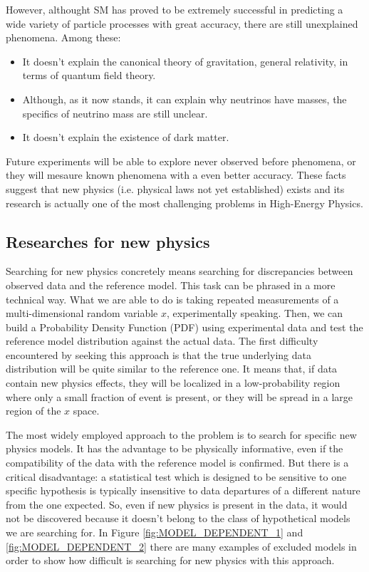 \noindent
However, althought SM has proved to be extremely successful in predicting a wide variety of particle processes with great accuracy, there are still unexplained phenomena. Among these:
\begin{itemize}
    \item It doesn't explain the canonical theory of gravitation, general relativity, in terms of quantum field theory\footnotemark.
    \item Although, as it now stands, it can explain why neutrinos have masses, the specifics of neutrino mass are still unclear.
    \item It doesn't explain the existence of dark matter.
\end{itemize}
Future experiments will be able to explore never observed before phenomena, or they will mesaure known phenomena with a even better accuracy. These facts suggest that new physics (i.e. physical laws not yet established) exists and its research is actually one of the most challenging problems in High-Energy Physics.



\subsection{Researches for new physics}
Searching for new physics concretely means searching for discrepancies between observed data and the reference model. This task can be phrased in a more technical way. What we are able to do is taking repeated measurements of a multi-dimensional random variable $x$, experimentally speaking. Then, we can build a Probability Density Function (PDF) using experimental data and test the reference model distribution against the actual data. The first difficulty encountered by seeking this approach is that the true underlying data distribution will be quite similar to the reference one. It means that, if data contain new physics effects, they will be localized in a low-probability region where only a small fraction of event is present, or they will be spread in a large region of the $x$ space.

The most widely employed approach to the problem is to search for specific new physics models. It has the advantage to be physically informative, even if the compatibility of the data with the reference model is confirmed. But there is a critical disadvantage: a statistical test which is designed to be sensitive to one specific hypothesis is typically insensitive to data departures of a different nature from the one expected. So, even if new physics is present in the data, it would not be discovered because it doesn't belong to the class of hypothetical models we are searching for. In Figure \ref{fig:MODEL_DEPENDENT_1} and \ref{fig:MODEL_DEPENDENT_2} there are many examples of excluded models in order to show how difficult is searching for new physics with this approach.



